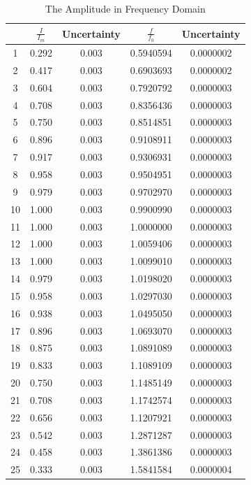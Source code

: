 \documentclass{my_template}
\begin{document}
    \begin{table}[H]
        \begin{center}
            \begin{tabular}{|c|c|c|c|c|}
                \hline
                &$\frac{I}{I_m}$&Uncertainty&\(\frac{f}{f_0}\)&Uncertainty\\\hline
                1&0.292&0.003&0.5940594&0.0000002\\\hline
                2&0.417&0.003&0.6903693&0.0000002\\\hline
                3&0.604&0.003&0.7920792&0.0000003\\\hline
                4&0.708&0.003&0.8356436&0.0000003\\\hline
                5&0.750&0.003&0.8514851&0.0000003\\\hline
                6&0.896&0.003&0.9108911&0.0000003\\\hline
                7&0.917&0.003&0.9306931&0.0000003\\\hline
                8&0.958&0.003&0.9504951&0.0000003\\\hline
                9&0.979&0.003&0.9702970&0.0000003\\\hline
                10&1.000&0.003&0.9900990&0.0000003\\\hline
                11&1.000&0.003&1.0000000&0.0000003\\\hline
                12&1.000&0.003&1.0059406&0.0000003\\\hline
                13&1.000&0.003&1.0099010&0.0000003\\\hline
                14&0.979&0.003&1.0198020&0.0000003\\\hline
                15&0.958&0.003&1.0297030&0.0000003\\\hline
                16&0.938&0.003&1.0495050&0.0000003\\\hline
                17&0.896&0.003&1.0693070&0.0000003\\\hline
                18&0.875&0.003&1.0891089&0.0000003\\\hline
                19&0.833&0.003&1.1089109&0.0000003\\\hline
                20&0.750&0.003&1.1485149&0.0000003\\\hline
                21&0.708&0.003&1.1742574&0.0000003\\\hline
                22&0.656&0.003&1.1207921&0.0000003\\\hline
                23&0.542&0.003&1.2871287&0.0000003\\\hline
                24&0.458&0.003&1.3861386&0.0000003\\\hline
                25&0.333&0.003&1.5841584&0.0000004\\\hline
            \end{tabular}
        \end{center}
        \caption{The Amplitude in Frequency Domain}
        \label{tab:Iandf}
    \end{table}
\end{document}
